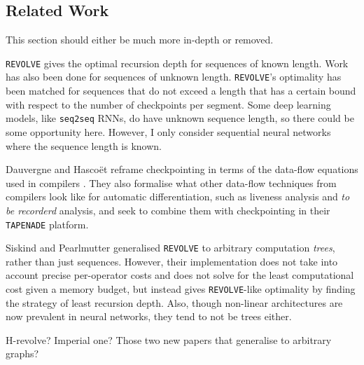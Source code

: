 \subsection{Related Work}
 This section should either be much more in-depth or removed.

\texttt{REVOLVE} gives the optimal recursion depth for sequences of known length.
Work has also been done for sequences of unknown length.
\texttt{REVOLVE}'s optimality has been matched for sequences that do not exceed a length that has a certain bound with respect to the number of checkpoints per segment.
Some deep learning models, like \texttt{seq2seq} RNNs, do have unknown sequence length, so there could be some opportunity here.
However, I only consider sequential neural networks where the sequence length is known.

Dauvergne and Hasco\"{e}t reframe checkpointing in terms of the data-flow equations used in compilers \cite{Dauvergne2006}.
They also formalise what other data-flow techniques from compilers look like for automatic differentiation, such as liveness analysis and \textit{to be recorderd} analysis, and seek to combine them with checkpointing in their \texttt{TAPENADE} platform.

Siskind and Pearlmutter \cite{Siskind2018} generalised \texttt{REVOLVE} to arbitrary computation \textit{trees}, rather than just sequences.
However, their implementation does not take into account precise per-operator costs and does not solve for the least computational cost given a memory budget, but instead gives \texttt{REVOLVE}-like optimality by finding the strategy of least recursion depth.
Also, though non-linear architectures are now prevalent in neural networks, they tend to not be trees either.

 H-revolve? Imperial one? Those two new papers that generalise to arbitrary graphs?

